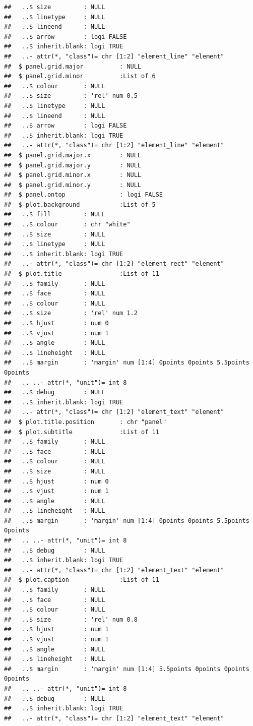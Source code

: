 \documentclass[
]{article}
\begin{document}
\begin{verbatim}
##   ..$ size         : NULL
##   ..$ linetype     : NULL
##   ..$ lineend      : NULL
##   ..$ arrow        : logi FALSE
##   ..$ inherit.blank: logi TRUE
##   ..- attr(*, "class")= chr [1:2] "element_line" "element"
##  $ panel.grid.major          : NULL
##  $ panel.grid.minor          :List of 6
##   ..$ colour       : NULL
##   ..$ size         : 'rel' num 0.5
##   ..$ linetype     : NULL
##   ..$ lineend      : NULL
##   ..$ arrow        : logi FALSE
##   ..$ inherit.blank: logi TRUE
##   ..- attr(*, "class")= chr [1:2] "element_line" "element"
##  $ panel.grid.major.x        : NULL
##  $ panel.grid.major.y        : NULL
##  $ panel.grid.minor.x        : NULL
##  $ panel.grid.minor.y        : NULL
##  $ panel.ontop               : logi FALSE
##  $ plot.background           :List of 5
##   ..$ fill         : NULL
##   ..$ colour       : chr "white"
##   ..$ size         : NULL
##   ..$ linetype     : NULL
##   ..$ inherit.blank: logi TRUE
##   ..- attr(*, "class")= chr [1:2] "element_rect" "element"
##  $ plot.title                :List of 11
##   ..$ family       : NULL
##   ..$ face         : NULL
##   ..$ colour       : NULL
##   ..$ size         : 'rel' num 1.2
##   ..$ hjust        : num 0
##   ..$ vjust        : num 1
##   ..$ angle        : NULL
##   ..$ lineheight   : NULL
##   ..$ margin       : 'margin' num [1:4] 0points 0points 5.5points 0points
##   .. ..- attr(*, "unit")= int 8
##   ..$ debug        : NULL
##   ..$ inherit.blank: logi TRUE
##   ..- attr(*, "class")= chr [1:2] "element_text" "element"
##  $ plot.title.position       : chr "panel"
##  $ plot.subtitle             :List of 11
##   ..$ family       : NULL
##   ..$ face         : NULL
##   ..$ colour       : NULL
##   ..$ size         : NULL
##   ..$ hjust        : num 0
##   ..$ vjust        : num 1
##   ..$ angle        : NULL
##   ..$ lineheight   : NULL
##   ..$ margin       : 'margin' num [1:4] 0points 0points 5.5points 0points
##   .. ..- attr(*, "unit")= int 8
##   ..$ debug        : NULL
##   ..$ inherit.blank: logi TRUE
##   ..- attr(*, "class")= chr [1:2] "element_text" "element"
##  $ plot.caption              :List of 11
##   ..$ family       : NULL
##   ..$ face         : NULL
##   ..$ colour       : NULL
##   ..$ size         : 'rel' num 0.8
##   ..$ hjust        : num 1
##   ..$ vjust        : num 1
##   ..$ angle        : NULL
##   ..$ lineheight   : NULL
##   ..$ margin       : 'margin' num [1:4] 5.5points 0points 0points 0points
##   .. ..- attr(*, "unit")= int 8
##   ..$ debug        : NULL
##   ..$ inherit.blank: logi TRUE
##   ..- attr(*, "class")= chr [1:2] "element_text" "element"

\end{verbatim}
\end{document}
